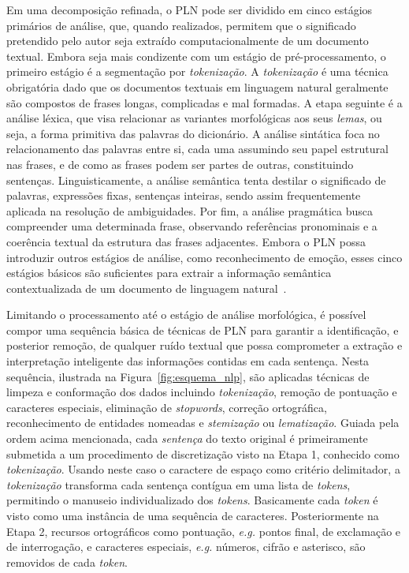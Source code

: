 \documentclass{SBCbookchapter}
\begin{document}
Em uma decomposição refinada, o PLN pode ser dividido em cinco estágios primários de análise, que, quando realizados, permitem que o significado pretendido pelo autor seja extraído computacionalmente de um documento textual. Embora seja mais condizente com um estágio de pré-processamento, o primeiro estágio é a segmentação por \textit{tokenização}. A \textit{tokenização} é uma técnica obrigatória dado que os documentos textuais em linguagem natural geralmente são compostos de frases longas, complicadas e mal formadas. A etapa seguinte é a análise léxica, que visa relacionar as variantes morfológicas aos seus \textit{lemas}, ou seja, a forma primitiva das palavras do dicionário. A análise sintática foca no relacionamento das palavras entre si, cada uma assumindo seu papel estrutural nas frases, e de como as frases podem ser partes de outras, constituindo sentenças. Linguisticamente, a análise semântica tenta destilar o significado de palavras, expressões fixas, sentenças inteiras, sendo assim frequentemente aplicada na resolução de ambiguidades. Por fim, a análise pragmática busca compreender uma determinada frase, observando referências pronominais %
e a coerência textual da estrutura das frases adjacentes. Embora o PLN possa introduzir outros estágios de análise, como reconhecimento de emoção, esses cinco estágios básicos são suficientes para extrair a informação semântica contextualizada de um documento de linguagem natural~\cite{dale2010}.

Limitando o processamento até o estágio de análise morfológica, é possível compor uma sequência básica de técnicas de PLN para garantir a identificação, e posterior remoção, de qualquer ruído textual que possa comprometer a extração e interpretação inteligente das informações contidas em cada sentença.
Nesta sequência, ilustrada na Figura~\ref{fig:esquema_nlp}, são aplicadas técnicas de limpeza e conformação dos dados incluindo
\textit{tokenização}, remoção de pontuação e caracteres especiais, eliminação de \textit{stopwords}, correção ortográfica, reconhecimento de entidades nomeadas e \textit{stemização} ou \textit{lematização}. Guiada pela ordem acima mencionada, cada \textit{sentença} do texto original é primeiramente submetida a um procedimento de discretização visto na Etapa 1, conhecido como \textit{tokenização}. Usando neste caso o caractere de espaço como critério delimitador, a \textit{tokenização} transforma cada sentença contígua em uma lista de \textit{tokens}, permitindo o manuseio individualizado dos \textit{tokens}. Basicamente cada \textit{token} é visto como uma instância de uma sequência de caracteres. Posteriormente na Etapa 2, recursos ortográficos como pontuação, \textit{e.g.} pontos final, de exclamação e de interrogação, e caracteres especiais, \textit{e.g.} números, cifrão e asterisco, são removidos de cada \textit{token}.
\end{document}
